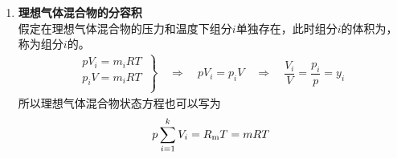 \begin{enumerate}[1.]
	\item \textbf{理想气体混合物的分容积}\\
	\hspace*{2em} 假定在理想气体混合物的压力和温度下组分$i$单独存在，此时组分$i$的体积为，称为组分$i$的。
	\begin{align}
		\left.
		\begin{aligned}
			pV_i = m_i R T \, \\
			p_iV = m_i R T \, \\
		\end{aligned}
		\right\rbrace
		\quad \Rightarrow \quad 
		pV_i = p_i V 
		\quad \Rightarrow \quad
		\dfrac{V_i}{V} = \dfrac{p_i}{p} = y_i
	\end{align}
	所以理想气体混合物状态方程也可以写为
	\begin{align}
		p \sum_{i = 1}^k V_i =  R_{\text{m}} T = mRT
	\end{align}
\end{enumerate}

